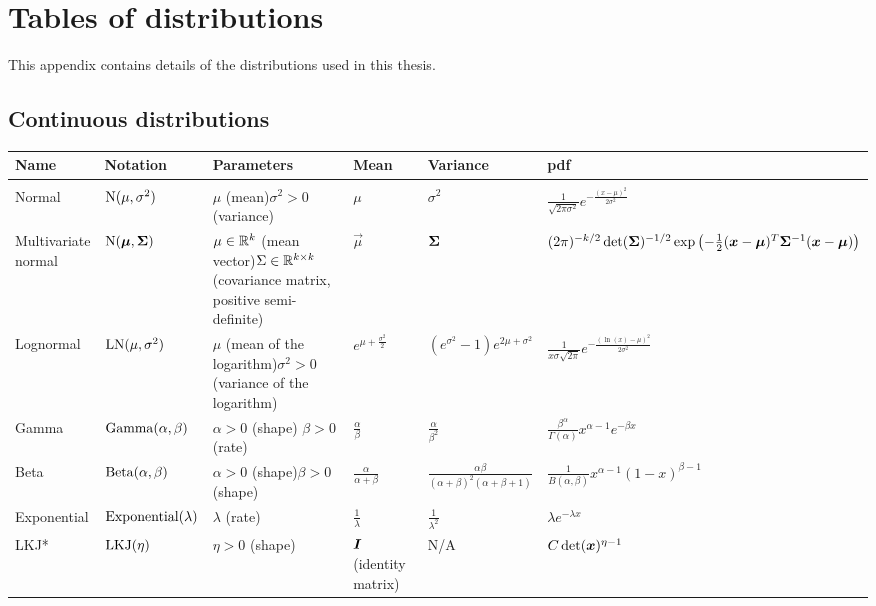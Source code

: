 \documentclass[thesis.tex]{subfiles}
\begin{document}
\chapter{Tables of distributions} \label{distributions}

This appendix contains details of the distributions used in this thesis.

\begin{landscape}
\section{Continuous distributions}
\begin{tabular}{llp{3.5cm}lll}
Name & Notation & Parameters & Mean & Variance & pdf\\
\hline \\
Normal & $\operatorname{N}(\mu, \sigma^2)$ & $\mu$ (mean)\newline $\sigma^2 > 0$ (variance) & $\mu$ & $\sigma^2$ & $\frac{1}{\sqrt{2\pi\sigma^2}}e^{-\frac{(x-\mu)^2}{2\sigma^2}}$ \\
\makecell{Multivariate \\ normal} & $\operatorname{N}(\bm{\mu}, \bm{\Sigma})$ & $\mu \in \mathbb{R}^k$ (mean vector)\newline $\Sigma \in \mathbb{R}^{k \times k}$ (covariance matrix, positive semi-definite) & $\vec{\mu}$ & $\bm{\Sigma}$ & $(2 \pi)^{-k / 2} \operatorname{det}(\bm{\Sigma})^{-1 / 2} \exp \left(-\frac{1}{2}(\bm{x}-\bm{\mu})^T \bm{\Sigma}^{-1}(\bm{x}-\bm{\mu})\right)$ \\
Lognormal & $\operatorname{LN}(\mu, \sigma^2)$ & $\mu$ (mean of the logarithm)\newline $\sigma^2 > 0$ (variance of the logarithm) & $e^{\mu + \frac{\sigma^2}{2}}$ & $(e^{\sigma^2} - 1)e^{2\mu + \sigma^2}$ & $\frac{1}{x\sigma\sqrt{2\pi}}e^{-\frac{(\ln(x)-\mu)^2}{2\sigma^2}}$ \\
Gamma & $\operatorname{Gamma}(\alpha, \beta)$ & $\alpha > 0$ (shape) \newline $\beta > 0$ (rate) & $\frac{\alpha}{\beta}$ & $\frac{\alpha}{\beta^2}$ & $\frac{\beta^\alpha}{\Gamma(\alpha)}x^{\alpha-1}e^{-\beta x}$ \\
Beta & $\operatorname{Beta}(\alpha, \beta)$ & $\alpha > 0$ (shape)\newline $\beta > 0$ (shape) & $\frac{\alpha}{\alpha+\beta}$ & $\frac{\alpha\beta}{(\alpha+\beta)^2(\alpha+\beta+1)}$ & $\frac{1}{B(\alpha,\beta)}x^{\alpha-1}(1-x)^{\beta-1}$ \\
Exponential & $\operatorname{Exponential}(\lambda)$ & $\lambda$ (rate) & $\frac{1}{\lambda}$ & $\frac{1}{\lambda^2}$ & $\lambda e^{-\lambda x}$ \\
LKJ* & $\operatorname{LKJ}(\eta)$ & $\eta > 0$ (shape) & $\bm{I}$ (identity matrix) & N/A & $C \det(\bm{x})^{\eta-1}$ \\
\end{tabular}


\end{landscape}
\end{document}
